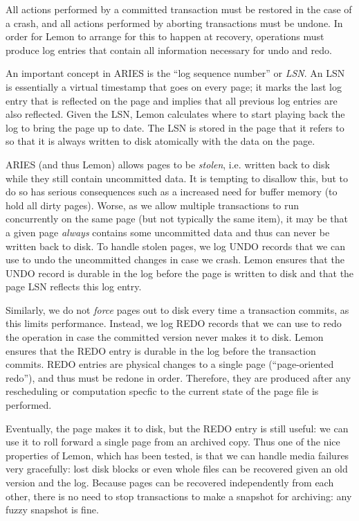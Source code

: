 \documentclass[letterpaper,twocolumn,english]{article}
\newcommand{\yad}{Lemon\xspace}
\begin{document}
All actions performed by a committed transaction must be
restored in the case of a crash, and all actions performed by aborting
transactions must be undone. In order for \yad to arrange for this
to happen at recovery, operations must produce log entries that contain
all information necessary for undo and redo.

An important concept in ARIES is the ``log sequence number'' or {\em
LSN}.  An LSN is essentially a virtual timestamp that goes on every
page; it marks the last log entry that is reflected on the page and
implies that all previous log entries are also reflected.  Given the
LSN, \yad calculates where to start playing back the log to bring the
page up to date.  The LSN is stored in the page that it refers to so
that it is always written to disk atomically with the data on the
page.

ARIES (and thus \yad) allows pages to be {\em stolen}, i.e. written
back to disk while they still contain uncommitted data.  It is
tempting to disallow this, but to do so has serious consequences such as
a increased need for buffer memory (to hold all dirty pages). Worse,
as we allow multiple transactions to run concurrently on the same page
(but not typically the same item), it may be that a given page {\em
always} contains some uncommitted data and thus can never be written
back to disk.  To handle stolen pages, we log UNDO records that
we can use to undo the uncommitted changes in case we crash.  \yad
ensures that the UNDO record is durable in the log before the
page is written to disk and that the page LSN reflects this log entry.

Similarly, we do not {\em force} pages out to disk every time a transaction
commits, as this limits performance.  Instead, we log REDO records
that we can use to redo the operation in case the committed version never
makes it to disk.  \yad ensures that the REDO entry is durable in the
log before the transaction commits.  REDO entries are physical changes
to a single page (``page-oriented redo''), and thus must be redone in
order.  Therefore, they are produced after any rescheduling or computation
specfic to the current state of the page file is performed.

Eventually, the page makes it to disk, but the REDO entry is still
useful: we can use it to roll forward a single page from an archived
copy.  Thus one of the nice properties of \yad, which has been tested,
is that we can handle media failures very gracefully: lost disk blocks
or even whole files can be recovered given an old version and the log.
Because pages can be recovered independently from each other, there is
no need to stop transactions to make a snapshot for archiving: any
fuzzy snapshot is fine.
\end{document}
